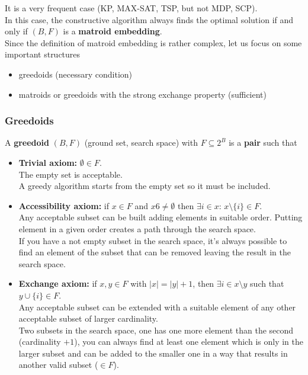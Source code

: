 \documentclass[11pt]{article}
\begin{document}
	It is a very frequent case (KP, MAX-SAT, TSP, but not MDP, SCP).\\
	
	In this case, the constructive algorithm always finds the optimal solution if and only if $(B, F)$ is a \textbf{matroid embedding}.\\
	
	Since the definition of matroid embedding is rather complex, let us focus on some important structures
	\begin{itemize}
		\item greedoids (necessary condition)
		\item matroids or greedoids with the strong exchange property (sufficient)
	\end{itemize}
	
	\newpage
	
	\subsubsection{Greedoids}
	A \textbf{greedoid} $(B, F)$ (ground set, search space) with $F \subseteq 2^B$ is a \textbf{pair} such that
	\begin{itemize}
		\item \textbf{Trivial axiom:} $\emptyset \in F$.\\
		The empty set is acceptable. \\
		A greedy algorithm starts from the empty set so it must be included.\\
		
		\item \textbf{Accessibility axiom:} if $x \in F$ and $x 6\neq \emptyset$ then $\exists i \in x : \, x \setminus \{i\} \in F$.\\
		Any acceptable subset can be built adding elements in suitable order. Putting element in a given order creates a path through the search space.\\
		If you have a not empty subset in the search space, it's always possible to find an element of the subset that can be removed leaving the result in the search space.\\
		
		\item \textbf{Exchange axiom:} if $x, y \in F$ with $|x| = |y| + 1$, then $\exists i \in x \setminus y$ such that $y \cup \{i\} \in F$.\\
		Any acceptable subset can be extended with a suitable element of any other acceptable subset of larger cardinality.\\
		Two subsets in the search space, one has one more element than the second (cardinality $+1$), you can always find at least one element which is only in the larger subset and can be added to the smaller one in a way that results in another valid subset ($\in F$).\\
	\end{itemize}
	
\end{document}
